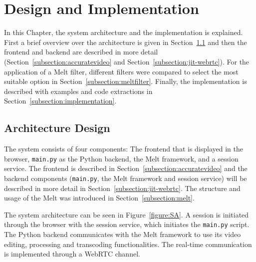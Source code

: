 \documentclass[../MasterThesis.tex]{subfiles}
\begin{document}
	
	
	
%
%
%
%
%
%
%
%
\newpage
\section{Design and Implementation} \label{section:designandimplementation}

In this Chapter, the system architecture and the implementation is explained. First a brief overview over the architecture is given in Section~\ref{subsection:architecturedesign} and then the frontend and backend are described in more detail (Section~\ref{subsection:accuratevideo} and Section~\ref{subsection:jit-webrtc}).
For the application of a Melt filter, different filters were compared to select the most suitable option in Section~\ref{subsection:meltfilter}. Finally, the implementation is described with examples and code extractions in Section~\ref{subsection:implementation}.





\subsection{Architecture Design} \label{subsection:architecturedesign}


The system consists of four components: The frontend that is displayed in the browser, \texttt{main.py} as the Python backend, the Melt framework, and a session service. The frontend is described in Section~\ref{subsection:accuratevideo} and the backend components (\texttt{main.py}, the Melt framework and session service) will be described in more detail in Section~\ref{subsection:jit-webrtc}. The structure and usage of the Melt was introduced in Section~\ref{subsection:melt}.


The system architecture can be seen in Figure~\ref{figure:SA}.
A session is initiated through the browser with the session service, which initiates the \texttt{main.py} script.
The Python backend communicates with the Melt framework to use its video editing, processing and transcoding functionalities. The real-time communication is implemented through a WebRTC channel.
\end{document}
